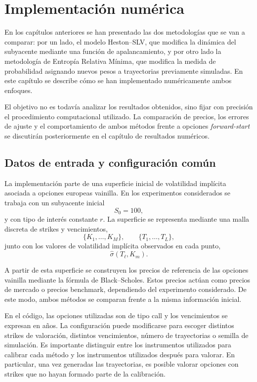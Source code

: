 \chapter{Implementación numérica}

En los capítulos anteriores se han presentado las dos metodologías que se van a comparar: por un lado, el modelo Heston--SLV, que modifica la dinámica del subyacente mediante una función de apalancamiento, y por otro lado la metodología de Entropía Relativa Mínima, que modifica la medida de probabilidad asignando nuevos pesos a trayectorias previamente simuladas. En este capítulo se describe cómo se han implementado numéricamente ambos enfoques.\medskip

El objetivo no es todavía analizar los resultados obtenidos, sino fijar con precisión el procedimiento computacional utilizado. La comparación de precios, los errores de ajuste y el comportamiento de ambos métodos frente a opciones \textit{forward-start} se discutirán posteriormente en el capítulo de resultados numéricos.

\section{Datos de entrada y configuración común}

La implementación parte de una superficie inicial de volatilidad implícita asociada a opciones europeas vainilla. En los experimentos considerados se trabaja con un subyacente inicial
\[
S_0=100,
\]
y con tipo de interés constante \(r\). La superficie se representa mediante una malla discreta de strikes y vencimientos,
\[
\{K_1,\ldots,K_M\},
\qquad
\{T_1,\ldots,T_L\},
\]
junto con los valores de volatilidad implícita observados en cada punto,
\[
\widehat{\sigma}(T_\ell,K_m).
\]

A partir de esta superficie se construyen los precios de referencia de las opciones vainilla mediante la fórmula de Black--Scholes. Estos precios actúan como precios de mercado o precios benchmark, dependiendo del experimento considerado. De este modo, ambos métodos se comparan frente a la misma información inicial.\medskip

En el código, las opciones utilizadas son de tipo call y los vencimientos se expresan en años. La configuración puede modificarse para escoger distintos strikes de valoración, distintos vencimientos, número de trayectorias o semilla de simulación. Es importante distinguir entre los instrumentos utilizados para calibrar cada método y los instrumentos utilizados después para valorar. En particular, una vez generadas las trayectorias, es posible valorar opciones con strikes que no hayan formado parte de la calibración.

